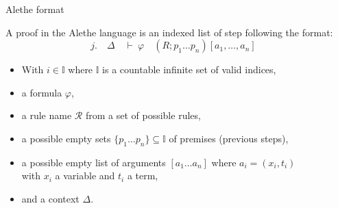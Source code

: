 \documentclass[aspectratio=169,xcolor={dvipsnames}]{beamer}
\begin{document}
\begin{frame}{Alethe format}
\begin{definition}
A proof in the Alethe language is an indexed list of step following the format:
\begin{equation*}
    j. \quad  \Delta \quad \vdash~ \varphi \quad (R; p_1 \dots p_n)[a_1, \dots, a_n]\quad
\end{equation*}
\begin{itemize}
    \item[] With $i \in \mathbb{I}$  where $\mathbb{I}$ is a countable infinite set of valid indices, 
    \item[] a formula $\varphi$,
    \item[] a rule name $\mathcal{R}$ from a set of possible rules,
    \item[] a possible empty sets $\{ p_1 \dots p_n \} \subseteq \mathbb{I}$ of premises (previous steps),
    \item[] a possible empty list of arguments $[a_1 \dots a_n]$ where $a_i = (x_i, t_i)$\\
    with $x_i$ a variable and $t_i$ a term,
    \item[] and a context $\Delta$.
\end{itemize}
\end{definition}
\end{frame}
\end{document}
